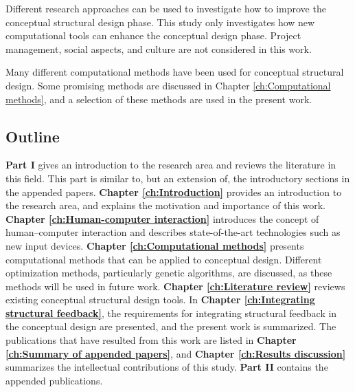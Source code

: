 Different research approaches can be used to investigate how to improve the conceptual structural design phase. This study only investigates how new computational tools can enhance the conceptual design phase. Project management, social aspects, and culture are not considered in this work.

Many different computational methods have been used for conceptual structural design. Some promising methods are discussed in Chapter \ref{ch:Computational methods}, and a selection of these methods are used in the present work.

\subsection{Outline}
\textbf{Part I} gives an introduction to the research area and reviews the literature in this field. This part is similar to, but an extension of, the introductory sections in the appended papers. \textbf{Chapter \ref{ch:Introduction}} provides an introduction to the research area, and explains the motivation and importance of this work. \textbf{Chapter \ref{ch:Human-computer interaction}} introduces the concept of human--computer interaction and describes state-of-the-art technologies such as new input devices. \textbf{Chapter \ref{ch:Computational methods}} presents computational methods that can be applied to conceptual design. Different optimization methods, particularly genetic algorithms, are discussed, as these methods will be used in future work. \textbf{Chapter \ref{ch:Literature review}} reviews existing conceptual structural design tools. In \textbf{Chapter \ref{ch:Integrating structural feedback}}, the requirements for integrating structural feedback in the conceptual design are presented, and the present work is summarized. The publications that have resulted from this work are listed in \textbf{Chapter \ref{ch:Summary of appended papers}}, and \textbf{Chapter \ref{ch:Results discussion}} summarizes the intellectual contributions of this study. \textbf{Part II}  contains the appended publications.

